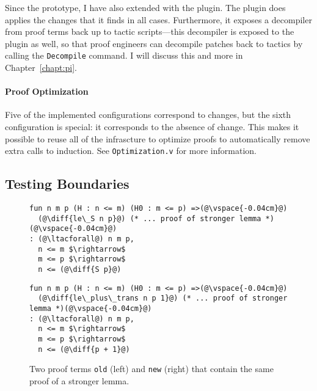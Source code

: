 Since the \sysname prototype, I have also extended \sysnamelong with the \toolnamec plugin.
The \toolnamec plugin does applies the changes that it finds in all cases.
Furthermore, it exposes a decompiler from proof terms back up to tactic scripts---this
decompiler is exposed to the \sysname plugin as well, so that proof engineers can decompile patches
back to tactics by calling the \lstinline{Decompile} command.
I will discuss this and more in Chapter~\ref{chapt:pi}.

\paragraph{Proof Optimization}
Five of the implemented configurations correspond to changes, but the sixth configuration is special:
it corresponds to the absence of change.
This makes it possible to reuse all of the \sysname infrascture to optimize proofs
to automatically remove extra calls to induction.
See \lstinline{Optimization.v} for more information.

\subsection{Testing Boundaries}
\label{sec:eval}

\begin{figure*}[ht]
\begin{minipage}{0.48\textwidth}
\begin{lstlisting}[language=coq]
fun n m p (H : n <= m) (H0 : m <= p) =>(@\vspace{-0.04cm}@)
  (@\diff{le\_S n p}@) (* ... proof of stronger lemma *)(@\vspace{-0.04cm}@)
: (@\ltacforall@) n m p,
  n <= m $\rightarrow$
  m <= p $\rightarrow$
  n <= (@\diff{S p}@)
\end{lstlisting}
\end{minipage}
\hfill
\begin{minipage}{0.48\textwidth}
\begin{lstlisting}[language=coq]
fun n m p (H : n <= m) (H0 : m <= p) =>(@\vspace{-0.04cm}@)
  (@\diff{le\_plus\_trans n p 1}@) (* ... proof of stronger lemma *)(@\vspace{-0.04cm}@)
: (@\ltacforall@) n m p,
  n <= m $\rightarrow$
  m <= p $\rightarrow$
  n <= (@\diff{p + 1}@)
\end{lstlisting}
\end{minipage}
\caption{Two proof terms \lstinline{old} (left) and \lstinline{new} (right) that contain the same proof of a stronger lemma.}
\label{fig:stronger}
\end{figure*}

